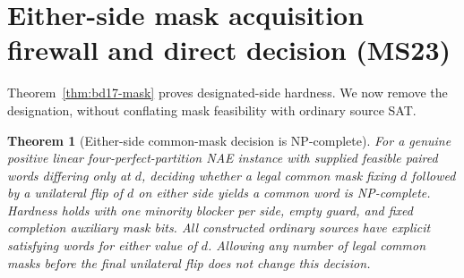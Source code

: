 \documentclass[11pt]{article}
\newtheorem{theorem}{Theorem}
\begin{document}
\section{Either-side mask acquisition firewall and direct decision (MS23)}\label{sec:ms23}
Theorem~\ref{thm:bd17-mask} proves designated-side hardness. We now remove the designation, without conflating mask feasibility with ordinary source SAT.
\begin{theorem}[Either-side common-mask decision is NP-complete]\label{thm:ms23-either}
For a genuine positive linear four-perfect-partition NAE instance with supplied feasible paired words differing only at $d$, deciding whether a legal common mask fixing $d$ followed by a unilateral flip of $d$ on \emph{either} side yields a common word is NP-complete. Hardness holds with one minority blocker per side, empty guard, and fixed completion auxiliary mask bits. All constructed ordinary sources have explicit satisfying words for either value of $d$. Allowing any number of legal common masks before the final unilateral flip does not change this decision.
\end{theorem}
\end{document}
